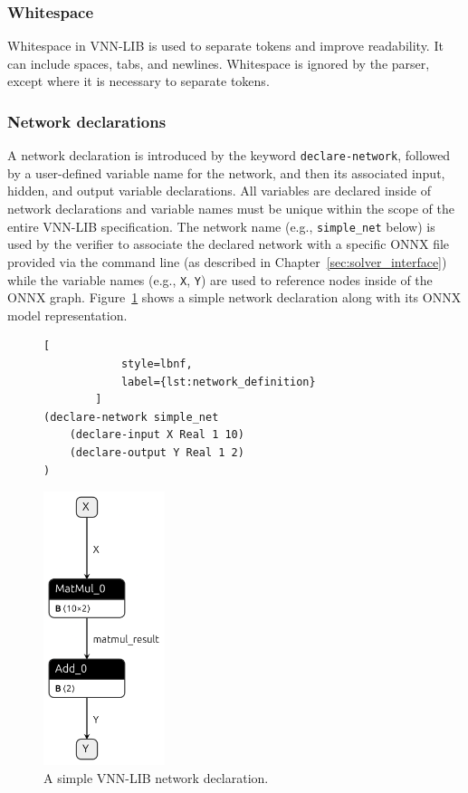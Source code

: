 \subsubsection*{Whitespace}
Whitespace in VNN-LIB is used to separate tokens and improve readability. It can include spaces, tabs, and newlines. Whitespace is ignored by the parser, except where it is necessary to separate tokens.

\subsubsection*{Network declarations}
\label{sec:network-declarations}
A network declaration is introduced by the keyword \texttt{declare-network}, followed by a user-defined variable name for the network, 
and then its associated input, hidden, and output variable declarations. All variables are declared inside of network declarations and variable 
names must be unique within the scope of the entire VNN-LIB specification.  The network name (e.g., \texttt{simple\_net} below) is used by the verifier to 
associate the declared network with a specific ONNX file provided via the command line (as described in Chapter~\ref{sec:solver_interface}) while the variable names 
(e.g., \texttt{X}, \texttt{Y}) are used to reference nodes inside of the ONNX graph. Figure~\ref{fig:simple_net} shows a simple network declaration along with its ONNX
model representation.

\begin{figure}[htbp]
    \begin{minipage}[c]{0.55\textwidth}
        \begin{lstlisting}[
            style=lbnf,
            label={lst:network_definition}
        ]
(declare-network simple_net
    (declare-input X Real 1 10)
    (declare-output Y Real 1 2)
) 
        \end{lstlisting}
    \end{minipage}%
    \begin{minipage}[c]{0.45\textwidth}
        \centering
        \includegraphics[height=8cm]{imgs/simple_net.onnx.png}
    \end{minipage}
    \caption{A simple VNN-LIB network declaration.}
    \label{fig:simple_net}
\end{figure}

